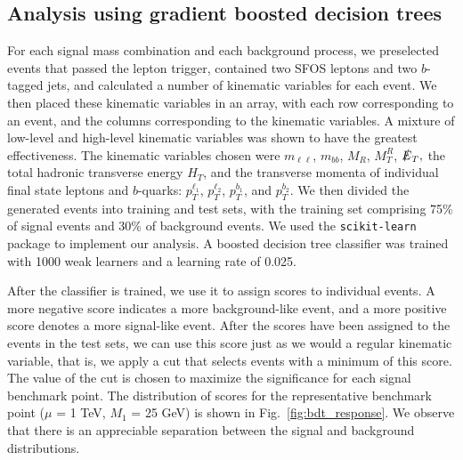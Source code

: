 \documentclass[a4paper,11pt]{article}
\begin{document}
\subsection{Analysis using gradient boosted decision trees}\label{subsec:bdt}

For each signal mass combination and each background process, we preselected
events that passed the lepton trigger, contained two SFOS leptons and two
$b$-tagged jets, and calculated a number of kinematic variables for each event.   We then
placed these kinematic variables in an array, with each row corresponding to an
event, and the columns corresponding to the kinematic variables. A mixture of
low-level and high-level kinematic variables was shown to have the greatest
effectiveness. The kinematic variables chosen were $m_{\ell\ell}$, $m_{bb}$,
$M_R$, $M_T^R$, $\slashed{E}_T,$ the total hadronic transverse energy $H_T$,
and the transverse momenta of individual final state leptons and $b$-quarks:
$p_T^{\ell_1}$, $p_T^{\ell_2}$, $p_T^{b_1}$, and $p_T^{b_2}$. We then divided
the generated events into training and test sets, with the training set
comprising 75\% of signal events and 30\% of background events.  We used the
\texttt{scikit-learn} package  \cite{Pedregosa2011} to implement our analysis.
A boosted decision tree classifier was trained with 1000 weak learners and a
learning rate of 0.025.  

After the classifier is trained, we use it to assign scores to individual
events. A more negative score indicates a more background-like event, and a
more positive score denotes a more signal-like event. After the scores have
been assigned to the events in the test sets, we can use this score just as we
would a regular kinematic variable, that is, we apply a cut that selects
events with a minimum of this score. The value of the cut is chosen to maximize
the significance for each signal benchmark point. The distribution of scores
for the representative benchmark point ($\mu$ = 1 TeV, $M_1$ = 25 GeV) is shown in Fig.~\ref{fig:bdt_response}. We observe that there is an appreciable
separation between the signal and background distributions.
\end{document}
